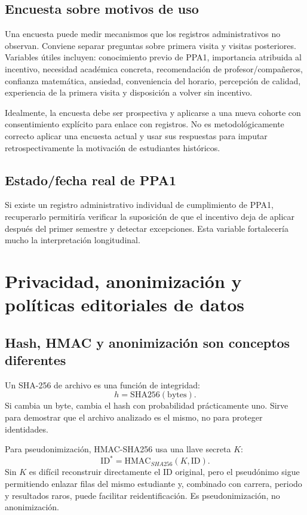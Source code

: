 \documentclass[11pt,letterpaper]{article}
\begin{document}
\subsection{Encuesta sobre motivos de uso}

Una encuesta puede medir mecanismos que los registros administrativos no observan. Conviene separar preguntas sobre primera visita y visitas posteriores. Variables útiles incluyen: conocimiento previo de PPA1, importancia atribuida al incentivo, necesidad académica concreta, recomendación de profesor/compañeros, confianza matemática, ansiedad, conveniencia del horario, percepción de calidad, experiencia de la primera visita y disposición a volver sin incentivo.

Idealmente, la encuesta debe ser prospectiva y aplicarse a una nueva cohorte con consentimiento explícito para enlace con registros. No es metodológicamente correcto aplicar una encuesta actual y usar sus respuestas para imputar retrospectivamente la motivación de estudiantes históricos.

\subsection{Estado/fecha real de PPA1}

Si existe un registro administrativo individual de cumplimiento de PPA1, recuperarlo permitiría verificar la suposición de que el incentivo deja de aplicar después del primer semestre y detectar excepciones. Esta variable fortalecería mucho la interpretación longitudinal.

\section{Privacidad, anonimización y políticas editoriales de datos}

\subsection{Hash, HMAC y anonimización son conceptos diferentes}

Un SHA-256 de archivo es una función de integridad:
\[
h=\mathrm{SHA256}(\mathrm{bytes}).
\]
Si cambia un byte, cambia el hash con probabilidad prácticamente uno. Sirve para demostrar que el archivo analizado es el mismo, no para proteger identidades.

Para pseudonimización, HMAC-SHA256 usa una llave secreta $K$:
\[
\mathrm{ID}^*=\mathrm{HMAC}_{SHA256}(K,\mathrm{ID}).
\]
Sin $K$ es difícil reconstruir directamente el ID original, pero el pseudónimo sigue permitiendo enlazar filas del mismo estudiante y, combinado con carrera, periodo y resultados raros, puede facilitar reidentificación. Es pseudonimización, no anonimización.
\end{document}

